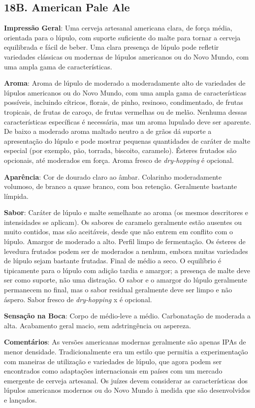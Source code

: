 \subsection*{18B. American Pale Ale}
\textbf{Impressão Geral}: Uma cerveja artesanal americana clara, de força média, orientada para o lúpulo, com suporte suficiente do malte para tornar a cerveja equilibrada e fácil de beber. Uma clara presença de lúpulo pode refletir variedades clássicas ou modernas de lúpulos americanos ou do Novo Mundo, com uma ampla gama de características.

\textbf{Aroma}: Aroma de lúpulo de moderado a moderadamente alto de variedades de lúpulos americanos ou do Novo Mundo, com uma ampla gama de características possíveis, incluindo cítricos, florais, de pinho, resinoso, condimentado, de frutas tropicais, de frutas de caroço, de frutas vermelhas ou de melão. Nenhuma dessas características específicas é necessária, mas um aroma lupulado deve ser aparente. De baixo a moderado aroma maltado neutro a de grãos dá suporte a apresentação do lúpulo e pode mostrar pequenas quantidades de caráter de malte especial (por exemplo, pão, torrada, biscoito, caramelo). Ésteres frutados são opcionais, até moderados em força. Aroma fresco de \textit{dry-hopping} é opcional.

\textbf{Aparência}: Cor de dourado claro ao âmbar. Colarinho moderadamente volumoso, de branco a quase branco, com boa retenção. Geralmente bastante límpida.

\textbf{Sabor}: Caráter de lúpulo e malte semelhante ao aroma (os mesmos descritores e intensidades se aplicam). Os sabores de caramelo geralmente estão ausentes ou muito contidos, mas são aceitáveis, desde que não entrem em conflito com o lúpulo. Amargor de moderado a alto. Perfil limpo de fermentação. Os ésteres de levedura frutados podem ser de moderados a nenhum, embora muitas variedades de lúpulo sejam bastante frutadas. Final de médio a seco. O equilíbrio é tipicamente para o lúpulo com adição tardia e amargor; a presença de malte deve ser como suporte, não uma distração. O sabor e o amargor do lúpulo geralmente permanecem no final, mas o sabor residual geralmente deve ser limpo e não áspero. Sabor fresco de \textit{dry-hopping} x  é opcional.

\textbf{Sensação na Boca}: Corpo de médio-leve a médio. Carbonatação de moderada a alta. Acabamento geral macio, sem adstringência ou aspereza.

\textbf{Comentários}: As versões americanas modernas geralmente são apenas IPAs de menor densidade. Tradicionalmente era um estilo que permitia a experimentação com maneiras de utilização e variedades de lúpulo, que agora podem ser encontrados como adaptações internacionais em países com um mercado emergente de cerveja artesanal. Os juízes devem considerar as características dos lúpulos americanos modernos ou do Novo Mundo à medida que são desenvolvidos e lançados.

